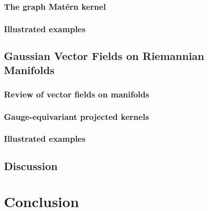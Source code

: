 \documentclass[11pt]{book}
\begin{document}
\subsection{The graph Matérn kernel}
\subsection{Illustrated examples}

\section{Gaussian Vector Fields on Riemannian Manifolds}

\subsection{Review of vector fields on manifolds}
\subsection{Gauge-equivariant projected kernels}
\subsection{Illustrated examples}

\section{Discussion}
\label{sec:noneuclidean-discussion}





\chapter{Conclusion}
\label{ch:conclusion}

\printbibliography
\end{document}
